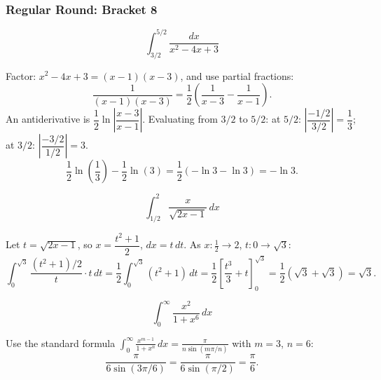 \subsubsection*{Regular Round: Bracket 8}
\begin{questions}

\question \[\int_{3/2}^{5/2} \frac{dx}{x^2-4x+3}\]
\begin{solution}
Factor: $x^2-4x+3=(x-1)(x-3)$, and use partial fractions:
\[
\frac{1}{(x-1)(x-3)}=\frac12\left(\frac{1}{x-3}-\frac{1}{x-1}\right).
\]
An antiderivative is $\dfrac12\ln\left|\dfrac{x-3}{x-1}\right|$. Evaluating from $3/2$ to $5/2$:
at $5/2$: $\left|\dfrac{-1/2}{3/2}\right|=\dfrac13$; at $3/2$: $\left|\dfrac{-3/2}{1/2}\right|=3$.
\[
\frac12\ln\!\left(\frac13\right)-\frac12\ln(3)=\frac12(-\ln3-\ln3)=-\ln3.
\]
\end{solution}

\question \[\int_{1/2}^2 \frac{x}{\sqrt{2x-1}}\,dx\]
\begin{solution}
Let $t=\sqrt{2x-1}$, so $x=\dfrac{t^2+1}{2}$, $dx=t\,dt$. As $x:\tfrac12\to2$, $t:0\to\sqrt3$:
\[
\int_0^{\sqrt3} \frac{(t^2+1)/2}{t}\cdot t\,dt=\frac12\int_0^{\sqrt3}(t^2+1)\,dt=\frac12\left[\frac{t^3}{3}+t\right]_0^{\sqrt3}=\frac12\left(\sqrt3+\sqrt3\right)=\sqrt3.
\]
\end{solution}

\question \[\int_0^\infty \frac{x^2}{1+x^6}\,dx\]
\begin{solution}
Use the standard formula $\displaystyle\int_0^\infty \frac{x^{m-1}}{1+x^n}\,dx=\frac{\pi}{n\sin(m\pi/n)}$ with $m=3$, $n=6$:
\[
\frac{\pi}{6\sin(3\pi/6)}=\frac{\pi}{6\sin(\pi/2)}=\frac{\pi}{6}.
\]
\end{solution}

\end{questions}

